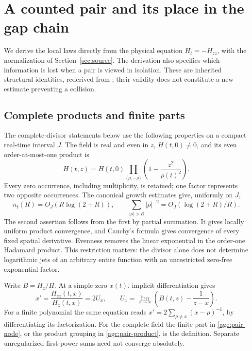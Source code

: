 \section{A counted pair and its place in the gap chain}
\label{sec:pair-chain}

We derive the local laws directly from the physical equation
$H_t=-H_{zz}$, with the normalization of Section~\ref{sec:source}.
The derivation also specifies which information is lost when a pair is
viewed in isolation. These are inherited structural identities, rederived
from \cite{VCDCMManuscript,VCDCMDiscussion08}; their validity does not
constitute a new estimate preventing a collision.

\subsection{Complete products and finite parts}

The complete-divisor statements below use the following properties on a
compact real-time interval $J$. The field is real and even in $z$,
$H(t,0)\ne0$, and its even order-at-most-one product is
\begin{equation}
 H(t,z)=H(t,0)\prod_{\{\rho,-\rho\}}
                  \left(1-\frac{z^2}{\rho(t)^2}\right).
 \label{agc:pair-product}
\end{equation}
Every zero occurrence, including multiplicity, is retained; one factor
represents two opposite occurrences. The canonical growth estimates give,
uniformly on $J$,
\begin{equation}
 n_t(R)=O_J(R\log(2+R)),\qquad
 \sum_{|\rho|>R}|\rho|^{-2}=O_J(\log(2+R)/R).
 \label{agc:pair-count}
\end{equation}
The second assertion follows from the first by partial summation.
It gives locally uniform product convergence, and Cauchy's formula gives
convergence of every fixed spatial derivative. Evenness removes the linear
exponential in the order-one Hadamard product. This restriction matters:
the divisor alone does not determine logarithmic jets of an arbitrary
entire function with an unrestricted zero-free exponential factor.

Write $B=H_z/H$. At a simple zero $x(t)$, implicit differentiation gives
\begin{equation}
 x'=\frac{H_{zz}(t,x)}{H_z(t,x)}=2U_x,
 \qquad
 U_x=\lim_{z\to x}\left(B(t,z)-\frac1{z-x}\right).
 \label{agc:pair-node}
\end{equation}
For a finite polynomial the same equation reads
$x'=2\sum_{\rho\ne x}(x-\rho)^{-1}$, by differentiating its
factorization. For the complete field the finite part in
\eqref{agc:pair-node}, or the product grouping in
\eqref{agc:pair-product}, is the definition. Separate unregularized
first-power sums need not converge absolutely.

